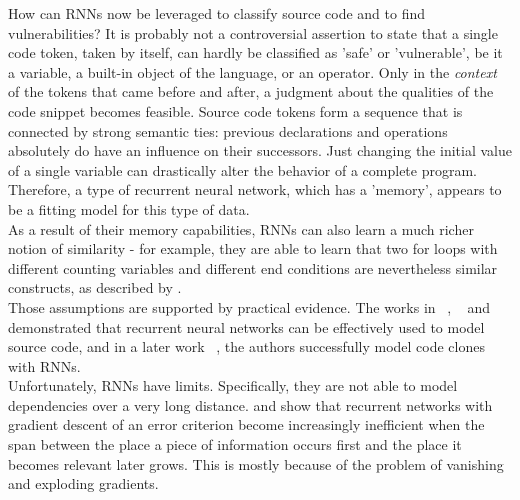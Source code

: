 \documentclass[
	a4paper,
	pagesize,
	pdftex,
	12pt,
	twoside, %
	BCOR=5mm, %
	ngerman,
	fleqn,
	final,
	]{scrartcl}
\begin{document}
How can RNNs now be leveraged to classify source code and to find vulnerabilities? It is probably not a controversial assertion to state that a single code token, taken by itself, can hardly be classified as 'safe' or 'vulnerable', be it a variable, a built-in object of the language, or an operator. Only in the \textit{context} of the tokens that came before and after, a judgment about the qualities of the code snippet becomes feasible. Source code tokens form a sequence that is connected by strong semantic ties: previous declarations and operations absolutely do have an influence on their successors. Just changing the initial value of a single variable can drastically alter the behavior of a complete program. Therefore, a type of recurrent neural network, which has a 'memory', appears to be a fitting model for this type of data.\\
As a result of their memory capabilities, RNNs can also learn a much richer notion of similarity - for example, they are able to learn that two for loops with different counting variables and different end conditions are nevertheless similar constructs, as described by \cite{Allamanis.2018}. \\
Those assumptions are supported by practical evidence. The works in ~\cite{White.2015}, ~\cite{Dam.2016b} and ~\cite{Dam.2016} demonstrated that recurrent neural networks can be effectively used to model source code, and in a later work ~\cite{White.2016}, the authors successfully model code clones with RNNs.\\
Unfortunately, RNNs have limits. Specifically, they are not able to model dependencies over a very long distance. \cite{Hochreiter.1991} and \cite{Bengio.1994} show that recurrent networks with gradient descent of an error criterion become increasingly inefficient when the span between the place a piece of information occurs first and the place it becomes relevant later grows. This is mostly because of the problem of vanishing and exploding gradients.\\
\end{document}
